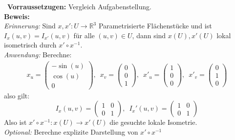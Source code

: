 \begin{solution}
  \
  \textbf{Vorraussetzugen:} Vergleich Aufgabenstellung. \\
  \textbf{Beweis:} \\
  \emph{Erinnerung:} Sind \( x, x': U \to \mathbb{R}^3 \) Parametrisierte Flächenstücke und ist \( I_x(u,v) = I_{x'}(u,v) \) für alle \( (u,v) \in U \), dann sind \( x(U), x'(U) \) lokal isometrisch durch \( x' \circ x^{-1} \). \\
  \emph{Anwendung:} Berechne: \\
  \begin{align*}
    x_u = \begin{pmatrix} 
      -\sin(u) \\ \cos(u) \\ 0 
    \end{pmatrix},\enspace
    x_v = \begin{pmatrix} 
      0 \\ 0 \\ 1 
    \end{pmatrix},\enspace
    {x'}_u = \begin{pmatrix} 
      1 \\ 0 \\ 0 
    \end{pmatrix},\enspace
    {x'}_v= \begin{pmatrix} 
      0 \\ 1 \\ 0 
    \end{pmatrix}
  \end{align*}
  also gilt:
  \begin{equation*}
    I_x(u,v) = \begin{pmatrix}
      1 & 0 \\
      0 & 1
    \end{pmatrix}, \enspace
    I_x'(u,v) = \begin{pmatrix}
      1 & 0 \\
      0 & 1
    \end{pmatrix}
  \end{equation*}
  Also ist \( x' \circ x^{-1}: x(U) \to x'(U) \) die gesuchte lokale Isometrie. \\
  \emph{Optional:} Berechne explizite Darstellung von \( x' \circ x^{-1} \) 
  
\end{solution}

